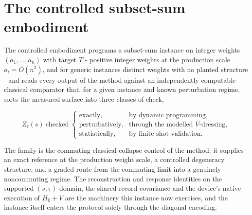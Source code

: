 \section{The controlled subset-sum embodiment}\label{sec:N5}

The controlled embodiment programs a subset-sum instance on integer weights $(a_1, \dots, a_n)$ with target $T$ - positive integer weights at the production scale $a_i = O(n^2)$, and for generic instances distinct weights with no planted structure - and reads every output of the method against an independently computable classical comparator that, for a given instance and known perturbation regime, sorts the measured surface into three classes of check,
\begin{widetext}
\[
Z_\tau(s)\ \text{checked}\
\begin{cases}
\text{exactly,} & \text{by dynamic programming},\\
\text{perturbatively,} & \text{through the modelled $V$-dressing},\\
\text{statistically,} & \text{by finite-shot validation}.
\end{cases}
\]
\end{widetext}
The family is the commuting classical-collapse control of the method: it supplies an exact reference at the production weight scale, a controlled degeneracy structure, and a graded route from the commuting limit into a genuinely noncommuting regime. The reconstruction and response identities on the supported $(s, \tau)$ domain, the shared-record covariance and the device's native execution of $H_0 + V$ are the machinery this instance now exercises, and the instance itself enters the protocol solely through the diagonal encoding.

